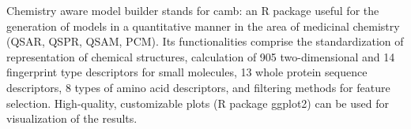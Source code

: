 Chemistry aware model builder stands for camb: an R package useful for the generation of models in a quantitative manner in the area of medicinal chemistry (QSAR, QSPR, QSAM, PCM). Its functionalities comprise the standardization of representation of chemical structures, calculation of 905 two-dimensional and 14 fingerprint type descriptors for small molecules, 13 whole protein sequence descriptors, 8 types of amino acid descriptors, and filtering methods for feature selection.  High-quality, customizable plots (R package ggplot2) can be used for visualization of the results. 